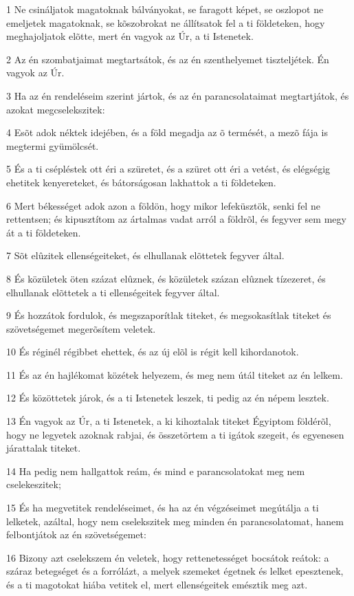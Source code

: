 \par 1 Ne csináljatok magatoknak bálványokat, se faragott képet, se oszlopot ne emeljetek magatoknak, se kõszobrokat ne állítsatok fel a ti földeteken, hogy meghajoljatok elõtte, mert én vagyok az Úr, a ti Istenetek.
\par 2 Az én szombatjaimat megtartsátok, és az én szenthelyemet tiszteljétek. Én vagyok az Úr.
\par 3 Ha az én rendeléseim szerint jártok, és az én parancsolataimat megtartjátok, és azokat megcselekszitek:
\par 4 Esõt adok néktek idejében, és a föld megadja az õ termését, a mezõ fája is megtermi gyümölcsét.
\par 5 És a ti csépléstek ott éri a szüretet, és a szüret ott éri a vetést, és elégségig ehetitek kenyereteket, és bátorságosan lakhattok a ti földeteken.
\par 6 Mert békességet adok azon a földön, hogy mikor lefeküsztök, senki fel ne rettentsen; és kipusztítom az ártalmas vadat arról a földrõl, és fegyver sem megy át a ti földeteken.
\par 7 Sõt elûzitek ellenségeiteket, és elhullanak elõttetek fegyver által.
\par 8 És közületek öten százat elûznek, és közületek százan elûznek tízezeret, és elhullanak elõttetek a ti ellenségeitek fegyver által.
\par 9 És hozzátok fordulok, és megszaporítlak titeket, és megsokasítlak titeket és szövetségemet megerõsítem veletek.
\par 10 És réginél régibbet ehettek, és az új elõl is régit kell kihordanotok.
\par 11 És az én hajlékomat közétek helyezem, és meg nem útál titeket az én lelkem.
\par 12 És közöttetek járok, és a ti Istenetek leszek, ti pedig az én népem lesztek.
\par 13 Én vagyok az Úr, a ti Istenetek, a ki kihoztalak titeket Égyiptom földérõl, hogy ne legyetek azoknak rabjai, és összetörtem a ti igátok szegeit, és egyenesen járattalak titeket.
\par 14 Ha pedig nem hallgattok reám, és mind e parancsolatokat meg nem cselekeszitek;
\par 15 És ha megvetitek rendeléseimet, és ha az én végzéseimet megútálja a ti lelketek, azáltal, hogy nem cselekszitek meg minden én parancsolatomat, hanem felbontjátok az én szövetségemet:
\par 16 Bizony azt cselekszem én veletek, hogy rettenetességet bocsátok reátok: a száraz betegséget és a forrólázt, a melyek szemeket égetnek és lelket epesztenek, és a ti  magotokat hiába vetitek el, mert ellenségeitek emésztik meg azt.
